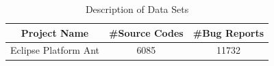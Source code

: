 \documentclass[conference]{IEEEtran}
\begin{document}
\begin{table}[htbp]
\caption{Description of Data Sets}
\label{tab:DDSl}
\centering
\begin{tabular}{|c|c|c|}
\hline
\textbf{Project Name}  &  \textbf{\#Source Codes} & \textbf{\#Bug Reports}\\
\hline
{Eclipse Platform Ant} & {6085} & 11732\\
\hline
\end{tabular}
\centering
\end{table}


\begin{table}[htbp]
\caption{Performance of Bugloactor and proposed technique (rVSM+Simi+Co-Occerence)}
\label{tab:Performance1}
\centering
{}
\end{table}
\end{document}
